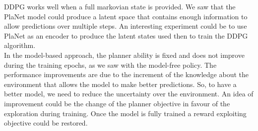 DDPG works well when a full markovian state is provided. We saw that the PlaNet model could produce a latent space that contains enough information to allow predictions over multiple steps. An interesting experiment could be to use PlaNet as an encoder to produce the latent states used then to train the DDPG algorithm. \\

In the model-based approach, the planner ability is fixed and does not improve during the training epochs, as we saw with the model-free policy. The performance improvements are due to the increment of the knowledge about the environment that allows the model to make better predictions. So, to have a better model, we need to reduce the uncertainty over the environment. An idea of improvement could be the change of the planner objective in favour of the exploration during training. Once the model is fully trained a reward exploiting objective could be restored.

